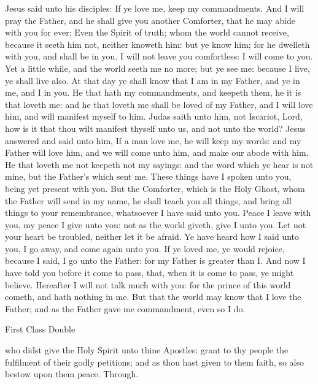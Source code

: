  Jesus said unto his disciples: If ye love me, keep my commandments. And I will pray the Father, and he shall give you another Comforter, that he may abide with you for ever; Even the Spirit of truth; whom the world cannot receive, because it seeth him not, neither knoweth him: but ye know him; for he dwelleth with you, and shall be in you. I will not leave you comfortless: I will come to you. Yet a little while, and the world seeth me no more; but ye see me: because I live, ye shall live also. At that day ye shall know that I am in my Father, and ye in me, and I in you. He that hath my commandments, and keepeth them, he it is that loveth me: and he that loveth me shall be loved of my Father, and I will love him, and will manifest myself to him. Judas saith unto him, not Iscariot, Lord, how is it that thou wilt manifest thyself unto us, and not unto the world? Jesus answered and said unto him,
%
If a man love me, he will keep my words: and my Father will love him, and we will come unto him, and make our abode with him. He that loveth me not keepeth not my sayings: and the word which ye hear is not mine, but the Father's which sent me. These things have I spoken unto you, being yet present with you. But the Comforter, which is the Holy Ghost, whom the Father will send in my name, he shall teach you all things, and bring all things to your remembrance, whatsoever I have said unto you. Peace I leave with you, my peace I give unto you: not as the world giveth, give I unto you. Let not your heart be troubled, neither let it be afraid. Ye have heard how I said unto you, I go away, and come again unto you. If ye loved me, ye would rejoice, because I said, I go unto the Father: for my Father is greater than I. And now I have told you before it come to pass, that, when it is come to pass, ye might believe. Hereafter I will not talk much with you: for the prince of this world cometh, and hath nothing in me. But that the world may know that I love the Father; and as the Father gave me commandment, even so I do.


\begin{inhead}
    {First Class Double}
\end{inhead}

\collect
{} who didst give the Holy Spirit unto thine Apostles: grant to thy people the fulfilment of their godly petitions; and as thou hast given to them faith, so also bestow upon them peace. Through.

